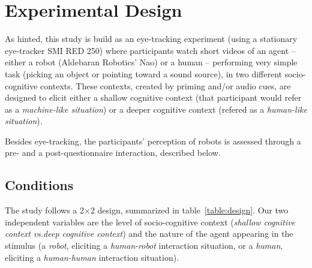\documentclass[lettersize, noapacite, twoside, HRI]{apa_HRI}
\newcommand{\vs}{\textit{vs.}\xspace}
\begin{document}
\section{Experimental Design}

As hinted, this study is build as an eye-tracking experiment (using a stationary
eye-tracker SMI RED 250) where participants watch short videos of an agent --
either a robot (Aldebaran Robotics' Nao) or a human -- performing very simple
task (picking an object or pointing toward a sound source), in two different
socio-cognitive contexts.  These contexts, created by priming and/or audio cues,
are designed to elicit either a shallow cognitive context (that participant
would refer as a \emph{machine-like situation}) or a deeper cognitive context
(refered as a \emph{human-like situation}).

Besides eye-tracking, the participants' perception of robots is assessed through a
pre- and a post-questionnaire interaction, described below.

\subsection{Conditions}

The study follows a 2$\times$2 design, summarized in table~\ref{table:design}. Our two
independent variables are the level of socio-cognitive context (\emph{shallow
cognitive context} \vs \emph{deep cognitive context}) and the nature of the
agent appearing in the stimulus (a \emph{robot}, eliciting a \emph{human-robot} interaction
situation, or a \emph{human}, eliciting a \emph{human-human} interaction
situation).
\end{document}

